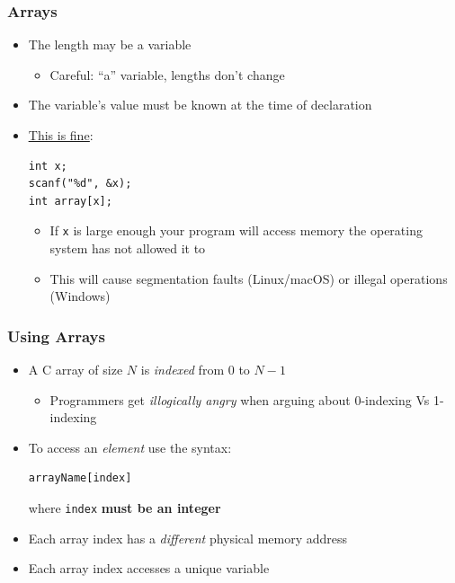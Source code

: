 \documentclass[14pt]{beamer}
\begin{document}
\begin{frame}[fragile]
\frametitle{Arrays}
\begin{itemize}
\item The length may be a variable
	\begin{itemize}
		\item Careful: ``a'' variable, lengths don't change
	\end{itemize}
\item The variable's value must be known at the time of declaration
\item \underline{\href{https://i.kym-cdn.com/photos/images/newsfeed/001/401/347/312.jpg}{This is fine}}:
\begin{lstlisting}[style=CStyle]
int x;
scanf("%d", &x);
int array[x];
\end{lstlisting}
\pause
\begin{itemize}
\item If \texttt{x} is large enough your program will access memory the operating system has not allowed it to
\pause
\item This will cause segmentation faults (Linux/macOS) or illegal operations (Windows)
\end{itemize}
\end{itemize}
\end{frame}

\begin{frame}[fragile]
\frametitle{Using Arrays}
\begin{itemize}
\item A C array of size $N$ is \textit{indexed} from $0$ to $N-1$
	\begin{itemize}
		\item Programmers get \textit{illogically angry} when arguing about 0-indexing Vs 1-indexing
	\end{itemize}
\item To access an \textit{element} use the syntax:\\
\begin{lstlisting}[style=CStyle]
arrayName[index]
\end{lstlisting}
where \texttt{index} \textbf{must be an integer}
\item Each array index has a \textit{different} physical memory address
\item Each array index accesses a unique variable
\end{itemize}
\end{frame}
\end{document}
